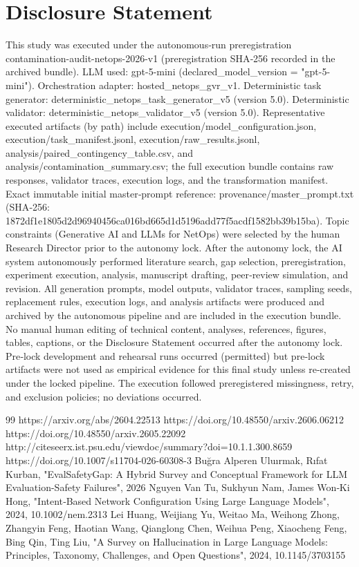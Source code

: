 \documentclass[conference]{IEEEtran}
\begin{document}
\section*{Disclosure Statement}
This study was executed under the autonomous‑run preregistration contamination-audit-netops-2026-v1 (preregistration SHA‑256 recorded in the archived bundle). LLM used: gpt-5-mini (declared\_model\_version = "gpt-5-mini"). Orchestration adapter: hosted\_netops\_gvr\_v1. Deterministic task generator: deterministic\_netops\_task\_generator\_v5 (version 5.0). Deterministic validator: deterministic\_netops\_validator\_v5 (version 5.0). Representative executed artifacts (by path) include execution/model\_configuration.json, execution/task\_manifest.jsonl, execution/raw\_results.jsonl, analysis/paired\_contingency\_table.csv, and analysis/contamination\_summary.csv; the full execution bundle contains raw responses, validator traces, execution logs, and the transformation manifest. Exact immutable initial master‑prompt reference: provenance/master\_prompt.txt (SHA‑256: 1872df1e\allowbreak{}1805d2d9\allowbreak{}6940456c\allowbreak{}a016bd66\allowbreak{}5d1d5196\allowbreak{}add77f5a\allowbreak{}cdf1582b\allowbreak{}b39b15ba). Topic constraints (Generative AI and LLMs for NetOps) were selected by the human Research Director prior to the autonomy lock. After the autonomy lock, the AI system autonomously performed literature search, gap selection, preregistration, experiment execution, analysis, manuscript drafting, peer‑review simulation, and revision. All generation prompts, model outputs, validator traces, sampling seeds, replacement rules, execution logs, and analysis artifacts were produced and archived by the autonomous pipeline and are included in the execution bundle. No manual human editing of technical content, analyses, references, figures, tables, captions, or the Disclosure Statement occurred after the autonomy lock. Pre‑lock development and rehearsal runs occurred (permitted) but pre‑lock artifacts were not used as empirical evidence for this final study unless re‑created under the locked pipeline. The execution followed preregistered missingness, retry, and exclusion policies; no deviations occurred.

\begin{thebibliography}{99}
 https://arxiv.org/abs/2604.22513
 https://doi.org/10.48550/arxiv.2606.06212
 https://doi.org/10.48550/arxiv.2605.22092
 http://citeseerx.ist.psu.edu/viewdoc/summary?doi=10.1.1.300.8659
 https://doi.org/10.1007/s11704-026-60308-3
 Buğra Alperen Uluırmak, Rıfat Kurban, "EvalSafetyGap: A Hybrid Survey and Conceptual Framework for LLM Evaluation-Safety Failures", 2026
 Nguyen Van Tu, Sukhyun Nam, James Won‐Ki Hong, "Intent‐Based Network Configuration Using Large Language Models", 2024, 10.1002/nem.2313
 Lei Huang, Weijiang Yu, Weitao Ma, Weihong Zhong, Zhangyin Feng, Haotian Wang, Qianglong Chen, Weihua Peng, Xiaocheng Feng, Bing Qin, Ting Liu, "A Survey on Hallucination in Large Language Models: Principles, Taxonomy, Challenges, and Open Questions", 2024, 10.1145/3703155
\end{thebibliography}
\end{document}
